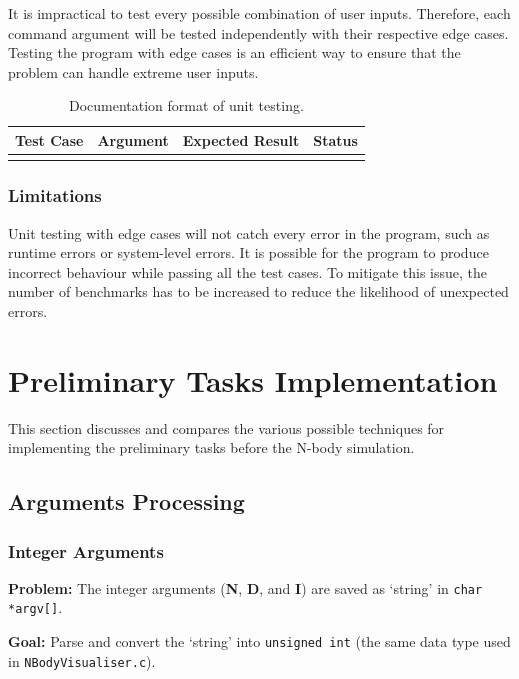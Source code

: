 \documentclass[12pt, a4paper]{article}
\begin{document}
It is impractical to test every possible combination of user inputs. Therefore, each command
argument will be tested independently with their respective edge cases. Testing the program with
edge cases is an efficient way to ensure that the problem can handle extreme user inputs.

\begin{table}[H]
  \centering
  \begin{tabular}{|c|c|c|c|}
    \hline \rowcolor{lightgray}
    Test Case & Argument & Expected Result & Status \\ \hline
    & & & \\ \hline
    \end{tabular}
  \caption{Documentation format of unit testing.}
\end{table}

\subsubsection{Limitations}
Unit testing with edge cases will not catch every error in the program, such as runtime errors or
system-level errors. It is possible for the program to produce incorrect behaviour while passing all
the test cases. To mitigate this issue, the number of benchmarks has to be increased to reduce the
likelihood of unexpected errors.

\section{Preliminary Tasks Implementation}
This section discusses and compares the various possible techniques for implementing the preliminary
tasks before the N-body simulation.

\subsection{Arguments Processing}
\subsubsection{Integer Arguments} \label{subsec:args}
\begin{tcolorbox}
\textbf{Problem:} The integer arguments (\textbf{N}, \textbf{D}, and \textbf{I}) are saved as
`string' in \texttt{char *argv[]}.

\bigskip\textbf{Goal:} Parse and convert the `string' into \texttt{unsigned int} (the same
data type used in \texttt{NBodyVisualiser.c}).
\end{tcolorbox}
\end{document}
